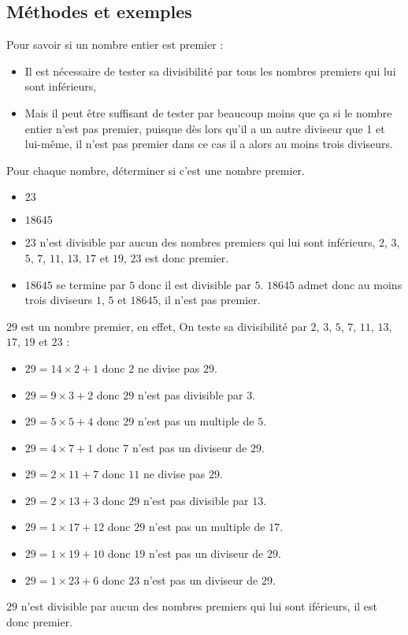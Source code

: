 \subsection{Méthodes et exemples}
\begin{methode}
	Pour savoir si un nombre entier est premier :
	\begin{itemize}
		\item Il est nécessaire de tester sa divisibilité par tous les nombres premiers qui lui sont inférieurs,
		\item Mais il peut être suffisant de tester par beaucoup moins que ça si le nombre entier n'est pas premier, puisque dès lors qu'il a un autre diviseur que 1 et lui-même, il n'est pas premier dans ce cas il a alors au moins trois diviseurs. 
	\end{itemize}
	\exercice
	Pour chaque nombre, déterminer si c'est une nombre premier.
	
	\begin{itemize}
		\item $23$
		\item $\num{18645}$
	\end{itemize}

	\correction
	\begin{itemize}
		\item $23$ n'est divisible par aucun des nombres premiers qui lui sont inférieurs, $2$, $3$, $5$, $7$, $11$, $13$, $17$ et $19$, $23$ est donc premier.
		\item $\num{18645}$ se termine par $5$ donc il est divisible par $5$.
		$\num{18645}$ admet donc au moins trois diviseurs $1$, $5$ et $\num{18645}$, il n'est pas premier.
	\end{itemize}
\end{methode}

\begin{exemple*1}
$29$ est un nombre premier, en effet, On teste sa divisibilité par $2$, $3$, $5$, $7$, $11$, $13$, $17$, $19$ et $23$ :
\begin{itemize}
	\item $29=14\times 2+1$ donc $2$ ne divise pas $29$.
	\item $29=9\times 3+2$ donc $29$ n'est pas divisible par $3$.
	\item $29=5\times 5+4$ donc $29$ n'est pas un multiple de $5$.
	\item $29=4\times 7+1$ donc $7$ n'est pas un diviseur de $29$.
	\item $29=2\times 11+7$ donc $11$ ne divise pas $29$.
	\item $29=2\times 13+3$ donc $29$ n'est pas divisible par $13$.
	\item $29=1\times 17+12$ donc $29$ n'est pas un multiple de $17$.
	\item $29=1\times 19+10$ donc $19$ n'est pas un diviseur de $29$.
	\item $29=1\times 23+6$ donc $23$ n'est pas un diviseur de $29$.
\end{itemize}

$29$ n'est divisible par aucun des nombres premiers qui lui sont iférieurs, il est donc premier.
\end{exemple*1}

